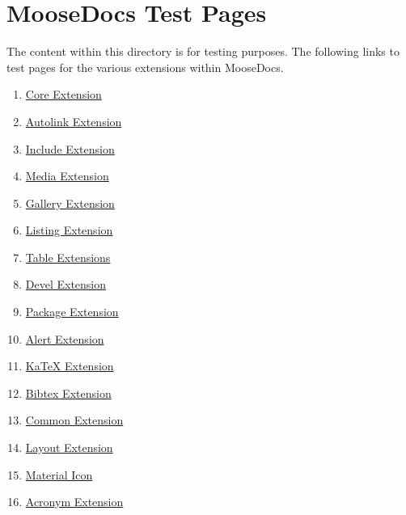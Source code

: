 
\part{\label{moosedocs-test-pages}MooseDocs Test Pages}
\par The content within this directory is for testing purposes. The following links to test pages for the various extensions within MooseDocs.
\begin{enumerate}
\item 
\par \hyperref[core-extension]{Core Extension} 
\item 
\par \hyperref[autolink-extension]{Autolink Extension} 
\item 
\par \hyperref[include-extension]{Include Extension} 
\item 
\par \hyperref[media-extension]{Media Extension} 
\item 
\par \hyperref[gallery-extension]{Gallery Extension} 
\item 
\par \hyperref[listing-extension]{Listing Extension} 
\item 
\par \hyperref[table-extensions]{Table Extensions} 
\item 
\par \hyperref[devel-extension]{Devel Extension} 
\item 
\par \hyperref[package-extension]{Package Extension} 
\item 
\par \hyperref[alert-extension]{Alert Extension} 
\item 
\par \hyperref[katex-extension]{KaTeX Extension} 
\item 
\par \hyperref[bibtex-extension]{Bibtex Extension} 
\item 
\par \hyperref[common-extension]{Common Extension} 
\item 
\par \hyperref[layout-extension]{Layout Extension} 
\item 
\par \hyperref[material-icon]{Material Icon} 
\item 
\par \hyperref[acronym-extension]{Acronym Extension} 

\end{enumerate}
